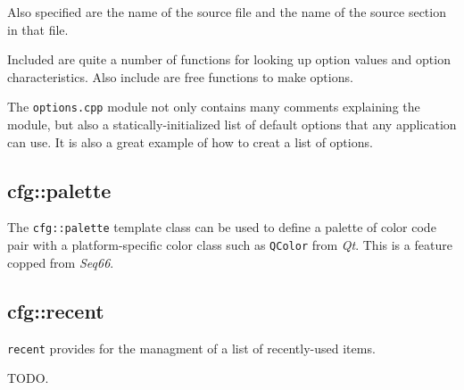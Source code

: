    Also specified are the name of the source file and the name of the
   source section in that file.

   Included are quite a number of functions for looking up option values
   and option characteristics.
   Also include are free functions to make options.

   The \texttt{options.cpp} module not only contains many comments explaining
   the module, but also a statically-initialized list of
   default options that any application can use.
   It is also a great example of how to creat a list of options.

\subsection{cfg::palette}
\label{subsec:cfg_namespace_}

   The \texttt{cfg::palette} template class can be used to define
   a palette of color code pair with a platform-specific color class
   such as \texttt{QColor} from \textsl{Qt}.
   This is a feature copped from \textsl{Seq66}.

\subsection{cfg::recent}
\label{subsec:cfg_namespace_recent}

   \texttt{recent} provides for the managment of a list of recently-used
   items.

   TODO.

